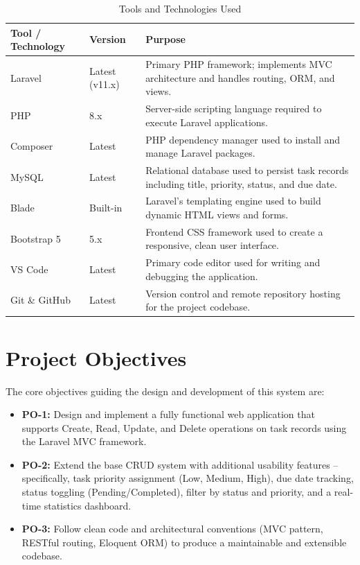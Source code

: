 \documentclass[12pt,a4paper]{report}
\begin{document}
\begin{table}[h!]
\centering
\caption{Tools and Technologies Used}
\label{tab:tools}
\renewcommand{\arraystretch}{1.3}
\begin{tabularx}{\textwidth}{@{}llX@{}}
\toprule
\textbf{Tool / Technology} & \textbf{Version} & \textbf{Purpose} \\
\midrule
Laravel       & Latest (v11.x)   & Primary PHP framework; implements MVC architecture and handles routing, ORM, and views. \\
PHP           & 8.x              & Server-side scripting language required to execute Laravel applications. \\
Composer      & Latest           & PHP dependency manager used to install and manage Laravel packages. \\
MySQL         & Latest           & Relational database used to persist task records including title, priority, status, and due date. \\
Blade         & Built-in         & Laravel's templating engine used to build dynamic HTML views and forms. \\
Bootstrap 5   & 5.x              & Frontend CSS framework used to create a responsive, clean user interface. \\
VS Code       & Latest           & Primary code editor used for writing and debugging the application. \\
Git \& GitHub & Latest           & Version control and remote repository hosting for the project codebase. \\
\bottomrule
\end{tabularx}
\end{table}

\section{Project Objectives}

The core objectives guiding the design and development of this system are:

\begin{itemize}[leftmargin=1.5cm]
    \item \textbf{PO-1:} Design and implement a fully functional web application that
    supports Create, Read, Update, and Delete operations on task records using the
    Laravel MVC framework.

    \item \textbf{PO-2:} Extend the base CRUD system with additional usability features
    -- specifically, task priority assignment (Low, Medium, High), due date tracking,
    status toggling (Pending/Completed), filter by status and priority, and a real-time
    statistics dashboard.

    \item \textbf{PO-3:} Follow clean code and architectural conventions (MVC pattern,
    RESTful routing, Eloquent ORM) to produce a maintainable and extensible codebase.
\end{itemize}
\end{document}
